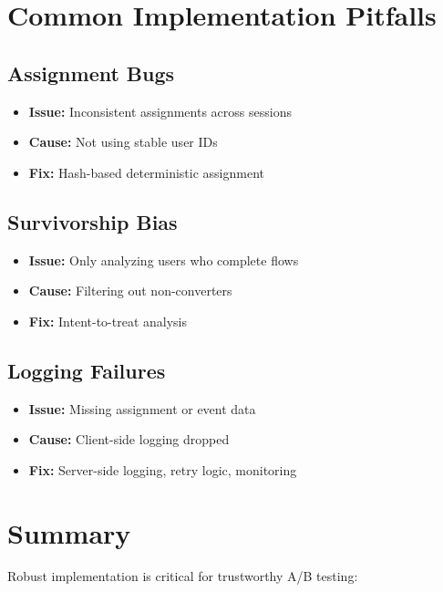 \section{Common Implementation Pitfalls}

\subsection{Assignment Bugs}

\begin{itemize}
    \item \textbf{Issue:} Inconsistent assignments across sessions
    \item \textbf{Cause:} Not using stable user IDs
    \item \textbf{Fix:} Hash-based deterministic assignment
\end{itemize}

\subsection{Survivorship Bias}

\begin{itemize}
    \item \textbf{Issue:} Only analyzing users who complete flows
    \item \textbf{Cause:} Filtering out non-converters
    \item \textbf{Fix:} Intent-to-treat analysis
\end{itemize}

\subsection{Logging Failures}

\begin{itemize}
    \item \textbf{Issue:} Missing assignment or event data
    \item \textbf{Cause:} Client-side logging dropped
    \item \textbf{Fix:} Server-side logging, retry logic, monitoring
\end{itemize}

\section{Summary}

Robust implementation is critical for trustworthy A/B testing:

